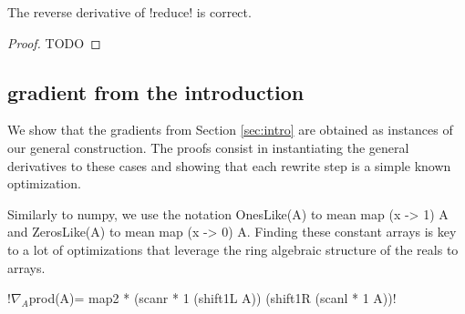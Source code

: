 \begin{proposition}
    The reverse derivative of !reduce! is correct.
\end{proposition}

\begin{proof}
    TODO
\end{proof}

\subsection{gradient from the introduction}
\label{sub:gradintro}

We show that the gradients from Section \ref{sec:intro} are obtained as instances of our general construction. 
The proofs consist in instantiating the general derivatives to these cases 
and showing that each rewrite step is a simple known optimization.

Similarly to numpy, we use the notation OnesLike(A) to mean map (x -> 1) A 
and ZerosLike(A) to mean map (x -> 0) A. 
Finding these constant arrays is key to a lot of optimizations that leverage the ring algebraic structure of the reals to arrays.

 \begin{lemma}
    !$\nabla_A$prod(A)= map2 * (scanr * 1 (shift1L A)) (shift1R (scanl * 1 A))!
 \end{lemma}


